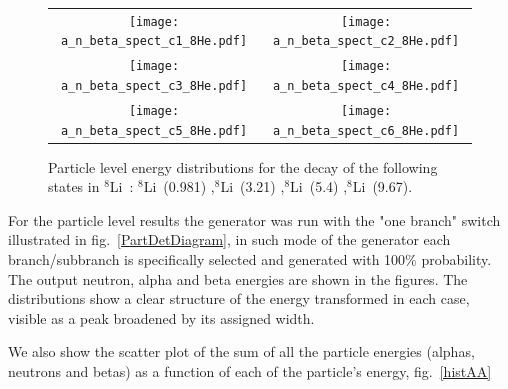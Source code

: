\documentclass{JINST}
\newcommand{\liEIGHT}{$^{8}$Li~}
\begin{document}
   \begin{figure}[htp]
     \centering
   
  \begin{tabular}{cc}
    \texttt{[image: a\_n\_beta\_spect\_c1\_8He.pdf]}&

    \texttt{[image: a\_n\_beta\_spect\_c2\_8He.pdf]}\\
    \texttt{[image: a\_n\_beta\_spect\_c3\_8He.pdf]}&

    \texttt{[image: a\_n\_beta\_spect\_c4\_8He.pdf]}\\
    
    \texttt{[image: a\_n\_beta\_spect\_c5\_8He.pdf]}&
    
      \texttt{[image: a\_n\_beta\_spect\_c6\_8He.pdf]}\\
      
   
    \end{tabular}
     \caption{Particle level energy distributions for the decay of the following states in \liEIGHT: \liEIGHT(0.981) ,\liEIGHT(3.21) ,\liEIGHT(5.4) ,\liEIGHT(9.67).}
    \end{figure}
       



       
       For the particle level results the generator was run with the "one branch" switch illustrated in fig.~\ref{PartDetDiagram},
       in such mode of the generator each branch/subbranch is specifically selected and generated with 100\% probability.
       The output neutron, alpha and beta energies are shown in the figures. The distributions show a clear structure of the energy transformed in each case, 
       visible as a peak broadened by its assigned width.%

       
       We also show the scatter plot of the sum of all the particle energies (alphas, neutrons and betas) as a function 
       of each of the particle's energy, fig.~\ref{histAA}
       
\end{document}
